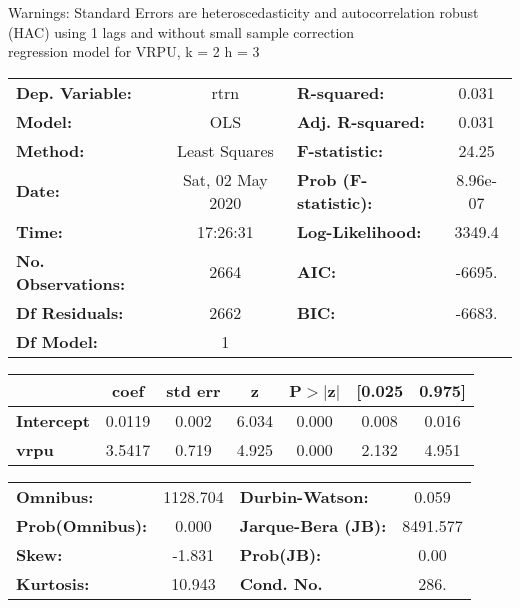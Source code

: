 Warnings: \newline
 [1] Standard Errors are heteroscedasticity and autocorrelation robust (HAC) using 1 lags and without small sample correction\\ 

regression model for VRPU, k = 2 h = 3\begin{center}
\begin{tabular}{lclc}
\toprule
\textbf{Dep. Variable:}    &       rtrn       & \textbf{  R-squared:         } &     0.031   \\
\textbf{Model:}            &       OLS        & \textbf{  Adj. R-squared:    } &     0.031   \\
\textbf{Method:}           &  Least Squares   & \textbf{  F-statistic:       } &     24.25   \\
\textbf{Date:}             & Sat, 02 May 2020 & \textbf{  Prob (F-statistic):} &  8.96e-07   \\
\textbf{Time:}             &     17:26:31     & \textbf{  Log-Likelihood:    } &    3349.4   \\
\textbf{No. Observations:} &        2664      & \textbf{  AIC:               } &    -6695.   \\
\textbf{Df Residuals:}     &        2662      & \textbf{  BIC:               } &    -6683.   \\
\textbf{Df Model:}         &           1      & \textbf{                     } &             \\
\bottomrule
\end{tabular}
\begin{tabular}{lcccccc}
                   & \textbf{coef} & \textbf{std err} & \textbf{z} & \textbf{P$> |$z$|$} & \textbf{[0.025} & \textbf{0.975]}  \\
\midrule
\textbf{Intercept} &       0.0119  &        0.002     &     6.034  &         0.000        &        0.008    &        0.016     \\
\textbf{vrpu}      &       3.5417  &        0.719     &     4.925  &         0.000        &        2.132    &        4.951     \\
\bottomrule
\end{tabular}
\begin{tabular}{lclc}
\textbf{Omnibus:}       & 1128.704 & \textbf{  Durbin-Watson:     } &    0.059  \\
\textbf{Prob(Omnibus):} &   0.000  & \textbf{  Jarque-Bera (JB):  } & 8491.577  \\
\textbf{Skew:}          &  -1.831  & \textbf{  Prob(JB):          } &     0.00  \\
\textbf{Kurtosis:}      &  10.943  & \textbf{  Cond. No.          } &     286.  \\
\bottomrule
\end{tabular}
\end{center}

